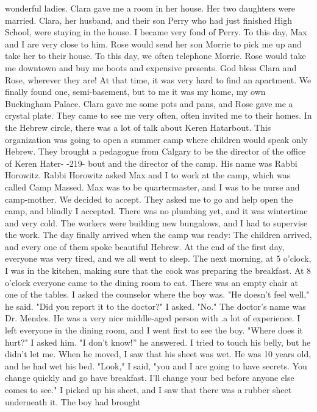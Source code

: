 wonderful ladies. 
Clara gave me a room in her house. Her two daughters were married. Clara, her
husband, and their son Perry who had just finished High School, were staying in the 
house. I became very fond of Perry. To this day, Max and I are very close to him. 
Rose would send her son Morrie to pick me up and take her to their house. To this 
day, we often telephone Morrie. Rose would take me downtown and buy me boots and 
expensive presents. God bless Clara and Rose, wherever they are! 
At that time, it was very hard to find an apartment. We finally found one, 
semi-basement, but to me it was my home, my own Buckingham Palace. Clara gave me some 
pots and pans, and Rose gave me a crystal plate. They came to see me very often, 
often invited me to their homes. 
In the Hebrew circle, there was a lot of talk about Keren Hatarbout. This organization was going to open a summer camp where children would speak only Hebrew. They
brought a pedagogue from Calgary to be the director of the office of Keren Hater-
-219- 
bout and the director of the camp. His name was Rabbi Horowitz. Rabbi Horowitz asked Max and I to work at the camp, which was called Camp Massed. Max was to be quartermaster, and I was to be nurse and camp-mother. We decided to accept. 
They asked me to go and help open the camp, and blindly I accepted. There was no 
plumbing yet, and it was wintertime and very cold. The workers were building new bungalows, and I had to supervise the work. The day finally arrived when the camp was 
ready: The children arrived, and every one of them spoke beautiful Hebrew. 
At the end of the first day, everyone was very tired, and we all went to sleep. 
The next morning, at 5 o'clock, I was in the kitchen, making sure that the cook was 
preparing the breakfast. At 8 o'clock everyone came to the dining room to eat. There 
was an empty chair at one of the tables. I asked the counselor where the boy was. 
"He doesn't feel well," he said. 
"Did you report it to the doctor?" I asked. 
"No." 
The doctor's name was Dr. Mendes. He was a very nice middle-aged person with .a 
lot of experience. I left everyone in the dining room, and I went first to see the boy. 
"Where does it hurt?" I asked him. 
"I don't know!” he answered. 
I tried to touch his belly, but he didn't let me. When he moved, I saw that his 
sheet was wet. He was 10 years old, and he had wet his bed. 
"Look," I said, "you and I are going to have secrets. You change quickly and go 
have breakfast. I'll change your bed before anyone else comes to see." I picked up 
his sheet, and I saw that there was a rubber sheet underneath it. The boy had brought 
